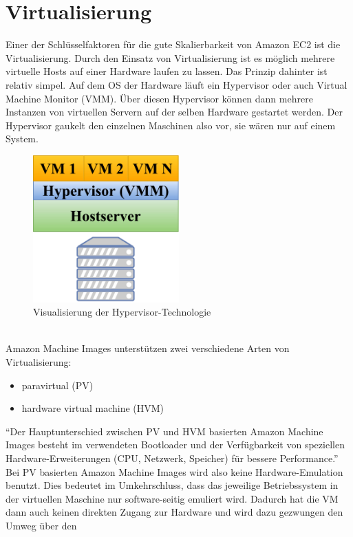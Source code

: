 \documentclass[titlepage]{report}
\begin{document}
\section*{Virtualisierung}
Einer der Schlüsselfaktoren für die gute Skalierbarkeit von Amazon EC2
ist die Virtualisierung. Durch den Einsatz von Virtualisierung ist es
möglich mehrere virtuelle Hosts auf einer Hardware laufen zu lassen.
Das Prinzip dahinter ist relativ simpel. Auf dem OS der Hardware läuft
ein Hypervisor oder auch Virtual Machine Monitor (VMM). Über diesen
Hypervisor können dann mehrere Instanzen von virtuellen Servern auf der
selben Hardware gestartet werden. Der Hypervisor gaukelt den einzelnen
Maschinen also vor, sie wären nur auf einem System.
\begin{figure}[h]
    \centering
    \includegraphics[width=0.5\textwidth]{figures/hypervisor.pdf}
    \caption{Visualisierung der Hypervisor\hyp{}Technologie}\label{fig:4}
\end{figure}
\\
Amazon Machine Images unterstützen zwei verschiedene Arten von
Virtualisierung:
\begin{itemize}
    \item paravirtual (PV)
    \item hardware virtual machine (HVM)
\end{itemize}
``Der Hauptunterschied zwischen PV und HVM basierten Amazon Machine
Images besteht im verwendeten Bootloader und der Verfügbarkeit von
speziellen Hardware\hyp{}Erweiterungen (CPU, Netzwerk, Speicher) für bessere
Performance.''\cite{virtualization} Bei PV basierten Amazon Machine
Images wird also keine Hardware\hyp{}Emulation benutzt. Dies bedeutet im
Umkehrschluss, dass das jeweilige Betriebssystem in der virtuellen Maschine nur
software\hyp{}seitig emuliert wird. Dadurch hat die VM dann auch keinen
direkten Zugang zur Hardware und wird dazu gezwungen den Umweg über den
\end{document}
